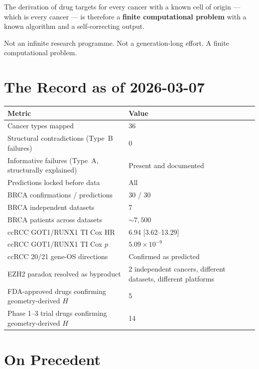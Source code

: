 \documentclass[11pt, a4paper]{article}
\begin{document}
The derivation of drug targets for every cancer with a
known cell of origin --- which is every cancer --- is
therefore a \textbf{finite computational problem} with a
known algorithm and a self-correcting output.

Not an infinite research programme. Not a
generation-long effort. A finite computational problem.

\section{The Record as of 2026-03-07}

\begin{center}
\begin{tabular}{p{7cm}p{6cm}}
\toprule
\textbf{Metric} & \textbf{Value} \\
\midrule
Cancer types mapped & 36 \\[0.3em]
Structural contradictions (Type~B failures) & 0 \\[0.3em]
Informative failures (Type~A, structurally explained) &
Present and documented \\[0.3em]
Predictions locked before data & All \\[0.3em]
BRCA confirmations / predictions & 30 / 30 \\[0.3em]
BRCA independent datasets & 7 \\[0.3em]
BRCA patients across datasets & ${\sim}7{,}500$ \\[0.3em]
ccRCC GOT1/RUNX1 TI Cox HR & 6.94 [3.62--13.29] \\[0.3em]
ccRCC GOT1/RUNX1 TI Cox $p$ & $5.09 \times 10^{-9}$ \\[0.3em]
ccRCC 20/21 gene-OS directions & Confirmed as predicted \\[0.3em]
EZH2 paradox resolved as byproduct & 2 independent cancers,
different datasets, different platforms \\[0.3em]
FDA-approved drugs confirming geometry-derived $H$ & 5 \\[0.3em]
Phase 1--3 trial drugs confirming geometry-derived $H$ & 14 \\[0.3em]
\bottomrule
\end{tabular}
\end{center}

\section{On Precedent}
\end{document}
